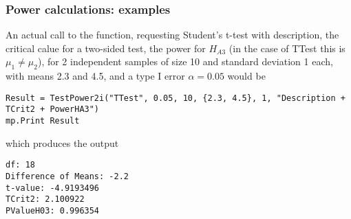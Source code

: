 %
%





\subsubsection{Power calculations: examples}
An actual call to the function, requesting Student's t-test with description, the critical calue for a two-sided test, the power for $H_{A3}$ (in the case of \textsf{TTest} this is $\mu_1 \neq \mu_2$), for 2 independent samples of size 10 and standard deviation 1 each, with means 2.3 and 4.5, and a type I error $\alpha=0.05$ would be

\begin{lstlisting}
Result = TestPower2i("TTest", 0.05, 10, {2.3, 4.5}, 1, "Description + TCrit2 + PowerHA3")
mp.Print Result
\end{lstlisting}
which produces the output

\begin{verbatim}
df: 18
Difference of Means: -2.2
t-value: -4.9193496
TCrit2: 2.100922
PValueH03: 0.996354
\end{verbatim}





